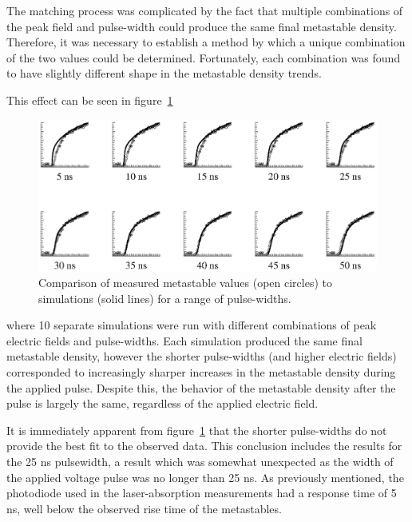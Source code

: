 The matching process was complicated by the fact that multiple combinations of
the peak field and pulse-width could produce the same final metastable density.
Therefore, it was necessary to establish a method by which a unique combination
of the two values could be determined. Fortunately, each combination was found
to have slightly different shape in the metastable density trends.

This effect can be seen in figure~\ref{fig:widths}
\begin{figure}
  \centering
  \includegraphics{./chapters/modeling/figures/widths.eps}
  \caption{Comparison of measured metastable values (open circles) to
    simulations (solid lines) for a range of pulse-widths.}
  \label{fig:widths}
\end{figure}
where 10 separate simulations were run with different combinations of peak
electric fields and pulse-widths. Each simulation produced the same final
metastable density, however the shorter pulse-widths (and higher electric
fields) corresponded to increasingly sharper increases in the metastable
density during the applied pulse. Despite this, the behavior of the metastable
density after the pulse is largely the same, regardless of the applied electric
field.

It is immediately apparent from figure~\ref{fig:widths} that the shorter
pulse-widths do not provide the best fit to the observed data. This conclusion
includes the results for the 25 ns pulsewidth, a result which was somewhat
unexpected as the width of the applied voltage pulse was no longer than 25 ns.
As previously mentioned, the photodiode used in the laser-absorption
measurements had a response time of 5 ns, well below the observed rise time of
the metastables.

